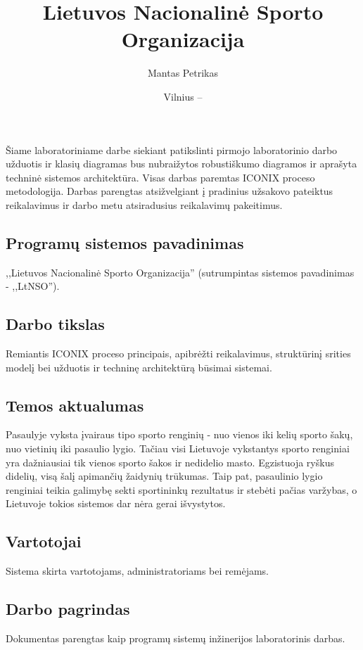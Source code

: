 \documentclass{VUMIFPSkursinis}
\title{Lietuvos Nacionalinė Sporto Organizacija}
\author{Mantas Petrikas}
\date{Vilnius – \the\year}
\begin{document}
    \maketitle
    \tableofcontents
    
     \label{anotacija}
		Šiame laboratoriniame darbe siekiant patikslinti pirmojo laboratorinio darbo užduotis ir klasių diagramas bus nubraižytos robustiškumo diagramos ir aprašyta techninė sistemos architektūra. Visas darbas paremtas ICONIX proceso metodologija.
		Darbas parengtas atsižvelgiant į pradinius užsakovo pateiktus reikalavimus ir darbo metu atsiradusius reikalavimų pakeitimus.
		
     \label{ivadas}	
        \subsection*{Programų sistemos pavadinimas} \label{ivadas_psPavadinimas}
            ,,Lietuvos Nacionalinė Sporto Organizacija'' (sutrumpintas sistemos pavadinimas - ,,LtNSO'').
        \subsection*{Darbo tikslas} \label{ivadas_darboTikslas}
            Remiantis ICONIX proceso principais, apibrėžti reikalavimus, struktūrinį srities modelį bei užduotis ir techninę architektūrą būsimai sistemai.
        \subsection*{Temos aktualumas} \label{ivadas_aktualumas}
            Pasaulyje vyksta įvairaus tipo sporto renginių - nuo vienos iki kelių sporto šakų, nuo vietinių iki pasaulio lygio. Tačiau visi Lietuvoje vykstantys sporto renginiai yra dažniausiai tik vienos sporto šakos ir nedidelio masto. Egzistuoja ryškus didelių, visą šalį apimančių žaidynių trūkumas. Taip pat, pasaulinio lygio renginiai teikia galimybę sekti sportininkų rezultatus ir stebėti pačias varžybas, o Lietuvoje tokios sistemos dar nėra gerai išvystytos.
        \subsection*{Vartotojai} \label{ivadas_naudotojai}
            Sistema skirta vartotojams, administratoriams bei remėjams.
        \subsection*{Darbo pagrindas} \label{ivadas_pagrindas}
            Dokumentas parengtas kaip programų sistemų inžinerijos laboratorinis darbas.
			
\end{document}
